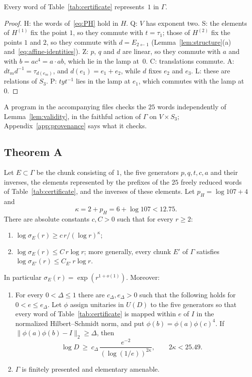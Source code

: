 \begin{lemma}\label{lem:validity}
Every word of Table~\ref{tab:certificate} represents~$1$ in $\Gamma$.
\end{lemma}

\begin{proof}
\textsf{H}: the words of~\eqref{eq:PH} hold in $H$.
\textsf{Q}: $V$ has exponent two.
\textsf{S}: the elements of $H^{(1)}$ fix the point $1$, so they commute with $t=\tau_1$; those of $H^{(2)}$ fix the points $1$ and $2$, so they
commute with $d=E_{2\leftarrow1}$ (Lemma~\ref{lem:structure}(a) and~\eqref{eq:affine-identities}).
\textsf{Z}: $p$, $q$ and $d$ are linear, so they commute with $a$ and with $b=ac^4=a\cdot ab$, which lie in the lamp at~$0$.
\textsf{C}: translations commute.
\textsf{A}: $dt_md^{-1}=\tau_{d(e_m)}$, and $d(e_1)=e_1+e_2$, while $d$ fixes $e_2$ and $e_3$.
\textsf{L}: these are relations of $S_3$.
\textsf{P}: $tyt^{-1}$ lies in the lamp at $e_1$, which commutes with the lamp at~$0$.
\end{proof}

A program in the accompanying files checks the $25$ words independently of Lemma~\ref{lem:validity}, in the faithful action of $\Gamma$ on
$V\times S_3$; Appendix~\ref{app:provenance} says what it checks.

\subsection{Theorem A}\label{sec:theorem-A}

\begin{theorem}[Theorem A]\label{thm:main-group}
Let $E\subset\Gamma$ be the chunk consisting of $1$, the five generators $p,q,t,c,a$ and their inverses, the elements represented by the prefixes
of the $25$ freely reduced words of Table~\ref{tab:certificate}, and the inverses of these elements. Let $p_H=\log107+4$ and
\[
\kappa=2+p_H=6+\log107<12.75 .
\]
There are absolute constants $c,C>0$ such that for every $r\ge2$:
\begin{enumerate}[label=(\alph*),itemsep=1pt]
\item $\log\sigma_E(r)\ge c\,r/(\log r)^\kappa$;
\item $\log\sigma_E(r)\le C\,r\log r$; more generally, every chunk $E'$ of $\Gamma$ satisfies $\log\sigma_{E'}(r)\le C_{E'}\,r\log r$.
\end{enumerate}
In particular $\sigma_E(r)=\exp(r^{1+o(1)})$. Moreover:
\begin{enumerate}[label=(\alph*),itemsep=1pt,resume]
\item For every $0<\Delta\le1$ there are $c_\Delta,e_\Delta>0$ such that the following holds for $0<e\le e_\Delta$. Let $\phi$ assign unitaries in
$U(D)$ to the five generators so that every word of Table~\ref{tab:certificate} is mapped within $e$ of $I$ in the normalized Hilbert--Schmidt
norm, and put $\phi(b)=\phi(a)\phi(c)^4$. If $\|\phi(a)\phi(b)-I\|_2\ge\Delta$, then
\[
\log D\ \ge\ c_\Delta\,\frac{e^{-2}}{(\log(1/e))^{2\kappa}},\qquad 2\kappa<25.49 .
\]
\item $\Gamma$ is finitely presented and elementary amenable.
\end{enumerate}
\end{theorem}

